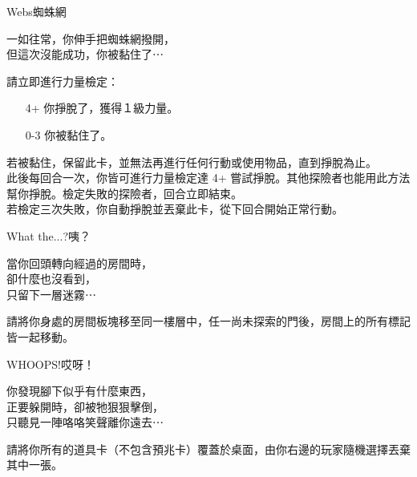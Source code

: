 %
\begin{EventCard}{Webs}{蜘蛛網}

  \begin{CardStory}
    一如往常，你伸手把蜘蛛網撥開，\\
    但這次沒能成功，你被黏住了⋯
  \end{CardStory}

  請立即進行力量檢定：
  \begin{itemize}
    \item[4+] 你掙脫了，獲得１級力量。
    \item[0-3] 你被黏住了。
  \end{itemize}

  若被黏住，保留此卡，並無法再進行任何行動或使用物品，直到掙脫為止。\\[0.5em]
  此後每回合一次，你皆可進行力量檢定達 4+ 嘗試掙脫。其他探險者也能用此方法幫你掙脫。檢定失敗的探險者，回合立即結束。\\[0.5em]
  若檢定三次失敗，你自動掙脫並丟棄此卡，從下回合開始正常行動。\\[0.5em]

\end{EventCard}%
%
\begin{EventCard}{What the...?}{咦？}

  \begin{CardStory}
    當你回頭轉向經過的房間時，\\
    卻什麼也沒看到，\\
    只留下一層迷霧⋯
  \end{CardStory}

  請將你身處的房間板塊移至同一樓層中，任一尚未探索的門後，房間上的所有標記皆一起移動。\\[0.5em]

\end{EventCard}%
%
\begin{EventCard}{WHOOPS!}{哎呀！}

  \begin{CardStory}
    你發現腳下似乎有什麼東西，\\
    正要躲開時，卻被牠狠狠擊倒，\\
    只聽見一陣咯咯笑聲離你遠去⋯
  \end{CardStory}

  請將你所有的道具卡（不包含預兆卡）覆蓋於桌面，由你右邊的玩家隨機選擇丟棄其中一張。\\[0.5em]

\end{EventCard}%

